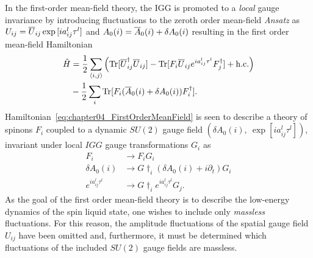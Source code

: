 In the first-order mean-field theory, the IGG is promoted to a \textit{local} gauge invariance by introducing fluctuations to the zeroth order mean-field \textit{Ansatz} as $U_{ij} = \overline{U}_{ij} \exp{[i a^l_{ij} \tau^l]}$ and $A_0(i) = \overline{A}_0(i) + \delta A_0(i)$ resulting in the first order mean-field Hamiltonian
%
\begin{align}
	\hat{H}	&= \frac{1}{2} \sum_{\langle i,j \rangle} \left(\text{Tr}{[\ensuremath{\overline{U}}\ensuremath{^{\dagger}}_{ij} \ensuremath{\overline{U}}_{ij}]} - \text{Tr}{[F_i \ensuremath{\overline{U}}_{ij} e^{i a^l_{ij} \tau^l} F\ensuremath{^{\dagger}}_j]} + {\rm h.c.}\right) \nonumber\\
			&- \frac{1}{2} \sum_i \text{Tr}{[F_i (\ensuremath{\overline{A}}_0(i) + \delta A_0(i)) F\ensuremath{^{\dagger}}_i]}.
	\label{eq:chapter04_FirstOrderMeanField}
\end{align}
%
Hamiltonian~\eqref{eq:chapter04_FirstOrderMeanField} is seen to describe a theory of spinons $F_i$ coupled to a dynamic $SU(2)$ gauge field $(\delta A_0(i),~\exp{[i a^l_{ij} \tau^l]})$, invariant under local $IGG$ gauge transformations $G_i$ as
%
\begin{align}
	F_i &\rightarrow F_i G_i \nonumber\\
	\delta A_0(i) &\rightarrow G\dag_i (\delta A_0(i) + i\partial_t) G_i \nonumber\\
	e^{i a^l_{ij} \tau^l} &\rightarrow G\dag_i e^{i a^l_{ij} \tau^l} G_j.
\end{align}
%
As the goal of the first order mean-field theory is to describe the low-energy dynamics of the spin liquid state, one wishes to include only \textit{massless} fluctuations.
For this reason, the amplitude fluctuations of the spatial gauge field $U_{ij}$ have been omitted and, furthermore, it must be determined which fluctuations of the included $SU(2)$ gauge fields are massless.

